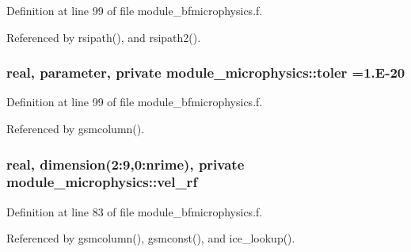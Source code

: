 Definition at line 99 of file module\+\_\+bfmicrophysics.\+f.



Referenced by rsipath(), and rsipath2().

\subsubsection[{\texorpdfstring{toler}{toler}}]{\setlength{\rightskip}{0pt plus 5cm}real, parameter, private module\+\_\+microphysics\+::toler =1.\+E-\/20\hspace{0.3cm}{\ttfamily [private]}}\hypertarget{namespacemodule__microphysics_a14f276771aea75d768df7e65c93e0092}{}\label{namespacemodule__microphysics_a14f276771aea75d768df7e65c93e0092}


Definition at line 99 of file module\+\_\+bfmicrophysics.\+f.



Referenced by gsmcolumn().

\subsubsection[{\texorpdfstring{vel\+\_\+rf}{vel_rf}}]{\setlength{\rightskip}{0pt plus 5cm}real, dimension(2\+:9,0\+:{\bf nrime}), private module\+\_\+microphysics\+::vel\+\_\+rf\hspace{0.3cm}{\ttfamily [private]}}\hypertarget{namespacemodule__microphysics_a2979744b6713e1ea75813ce1329967c6}{}\label{namespacemodule__microphysics_a2979744b6713e1ea75813ce1329967c6}


Definition at line 83 of file module\+\_\+bfmicrophysics.\+f.



Referenced by gsmcolumn(), gsmconst(), and ice\+\_\+lookup().

